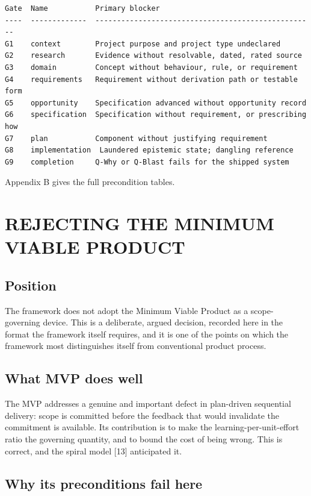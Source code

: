 \documentclass[11pt,a4paper]{article}
\begin{document}
\begin{Verbatim}[fontsize=\footnotesize,breaklines=true,breakanywhere=true,breakautoindent=false,samepage=false]
Gate  Name           Primary blocker
----  -------------  ---------------------------------------------------
G1    context        Project purpose and project type undeclared
G2    research       Evidence without resolvable, dated, rated source
G3    domain         Concept without behaviour, rule, or requirement
G4    requirements   Requirement without derivation path or testable form
G5    opportunity    Specification advanced without opportunity record
G6    specification  Specification without requirement, or prescribing how
G7    plan           Component without justifying requirement
G8    implementation  Laundered epistemic state; dangling reference
G9    completion     Q-Why or Q-Blast fails for the shipped system
\end{Verbatim}

Appendix B gives the full precondition tables.

\section{REJECTING THE MINIMUM VIABLE PRODUCT}

\subsection{Position}

The framework does not adopt the Minimum Viable Product as a scope-governing device. This is a deliberate, argued decision, recorded here in the format the framework itself requires, and it is one of the points on which the framework most distinguishes itself from conventional product process.

\subsection{What MVP does well}

The MVP addresses a genuine and important defect in plan-driven sequential delivery: scope is committed before the feedback that would invalidate the commitment is available. Its contribution is to make the learning-per-unit-effort ratio the governing quantity, and to bound the cost of being wrong. This is correct, and the spiral model [13] anticipated it.

\subsection{Why its preconditions fail here}
\end{document}
